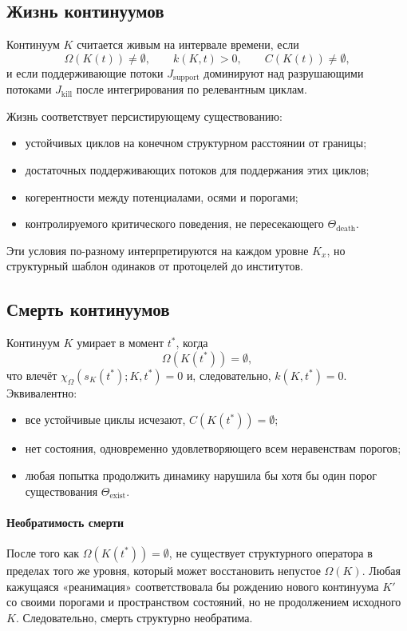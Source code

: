 \subsection{Жизнь континуумов}

Континуум \(K\) считается живым на интервале времени, если
\[
    \Omega(K(t)) \neq \emptyset,\qquad
    k(K,t) > 0,\qquad
    C(K(t)) \neq \emptyset,
\]
и если поддерживающие потоки \(J_{\mathrm{support}}\) доминируют над
разрушающими потоками \(J_{\mathrm{kill}}\) после интегрирования по релевантным циклам.

Жизнь соответствует персистирующему существованию:
\begin{itemize}
    \item устойчивых циклов на конечном структурном расстоянии от границы;
    \item достаточных поддерживающих потоков для поддержания этих циклов;
    \item когерентности между потенциалами, осями и порогами;
    \item контролируемого критического поведения, не пересекающего \(\Theta_{\mathrm{death}}\).
\end{itemize}

Эти условия по-разному интерпретируются на каждом уровне \(K_x\), но структурный
шаблон одинаков от протоцелей до институтов.

\subsection{Смерть континуумов}

Континуум \(K\) умирает в момент \(t^\ast\), когда
\[
    \Omega(K(t^\ast)) = \emptyset,
\]
что влечёт \(\chi_{\Omega}(s_K(t^\ast);K,t^\ast)=0\) и, следовательно, \(k(K,t^\ast)=0\).
Эквивалентно:
\begin{itemize}
    \item все устойчивые циклы исчезают, \(C(K(t^\ast)) = \emptyset\);
    \item нет состояния, одновременно удовлетворяющего всем неравенствам порогов;
    \item любая попытка продолжить динамику нарушила бы хотя бы один порог существования \(\Theta_{\mathrm{exist}}\).
\end{itemize}

\paragraph{Необратимость смерти}
После того как \(\Omega(K(t^\ast)) = \emptyset\), не существует структурного оператора в пределах
того же уровня, который может восстановить непустое \(\Omega(K)\).
Любая кажущаяся «реанимация» соответствовала бы рождению нового континуума \(K'\) со своими
порогами и пространством состояний, но не продолжением исходного \(K\).
Следовательно, смерть структурно необратима.

